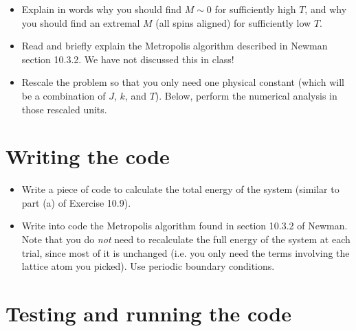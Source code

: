 \documentclass[11pt, preprint]{aastex}
\begin{document}
\begin{itemize}
\item Explain in words why you should find $M\sim 0$ for sufficiently
  high $T$, and why you should find an extremal $M$ (all spins
  aligned) for sufficiently low $T$.
\item Read and briefly explain the Metropolis algorithm described in
  Newman section 10.3.2. We have not discussed this in class!
\item Rescale the problem so that you only need one physical constant
  (which will be a combination of $J$, $k$, and $T$). Below, perform
  the numerical analysis in those rescaled units.
\end{itemize}

\section{Writing the code}

\begin{itemize}
\item Write a piece of code to calculate the total energy of the
  system (similar to part (a) of Exercise 10.9). 
\item Write into code the Metropolis algorithm found in section 10.3.2
  of Newman. Note that you do {\it not} need to recalculate the full
  energy of the system at each trial, since most of it is unchanged
  (i.e. you only need the terms involving the lattice atom you
  picked). Use periodic boundary conditions.
\end{itemize}

\section{Testing and running the code}
\end{document}

